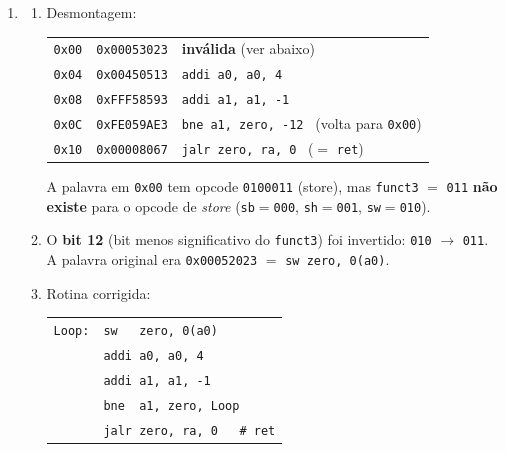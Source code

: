 \documentclass[11pt, a4paper]{article}
\begin{document}
\begin{enumerate}
\item \begin{enumerate}
  \item Desmontagem:
\begin{center}
\small
\begin{tabular}{lll}
\texttt{0x00} & \texttt{0x00053023} & \textbf{inv\'{a}lida} (ver abaixo)\\
\texttt{0x04} & \texttt{0x00450513} & \texttt{addi a0, a0, 4}\\
\texttt{0x08} & \texttt{0xFFF58593} & \texttt{addi a1, a1, -1}\\
\texttt{0x0C} & \texttt{0xFE059AE3} & \texttt{bne a1, zero, -12} \ (volta para \texttt{0x00})\\
\texttt{0x10} & \texttt{0x00008067} & \texttt{jalr zero, ra, 0} \ ($=$ \texttt{ret})\\
\end{tabular}
\end{center}
A palavra em \texttt{0x00} tem opcode \texttt{0100011} (store), mas \texttt{funct3} $=$ \texttt{011} \textbf{n\~{a}o existe} para o opcode de \emph{store} (\texttt{sb}$=$\texttt{000}, \texttt{sh}$=$\texttt{001}, \texttt{sw}$=$\texttt{010}).
  \item O \textbf{bit 12} (bit menos significativo do \texttt{funct3}) foi invertido: \texttt{010} $\rightarrow$ \texttt{011}. A palavra original era \texttt{0x00052023} $=$ \texttt{sw zero, 0(a0)}.
  \item Rotina corrigida:
\begin{center}
\begin{tabular}{ll}
\texttt{Loop:} & \texttt{sw \ \ zero, 0(a0)}\\
 & \texttt{addi a0, a0, 4}\\
 & \texttt{addi a1, a1, -1}\\
 & \texttt{bne \ a1, zero, Loop}\\
 & \texttt{jalr zero, ra, 0 \ \ \# ret}\\
\end{tabular}
\end{center}
\end{enumerate}


\end{enumerate}
\end{document}

